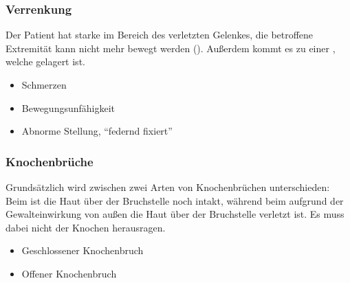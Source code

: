\subsubsection{Verrenkung}
\label{topic:verrenkung-eh}




{%
Der Patient hat starke  im Bereich des verletzten Gelenkes,
die betroffene Extremität kann nicht mehr bewegt werden
(). Außerdem kommt es zu einer , welche  gelagert ist. 

\bigskip

\bigskip

\bigskip
}{
\begin{itemize}
    \item Schmerzen
    \item Bewegungsunfähigkeit
    \item Abnorme Stellung, \enquote{federnd fixiert}
\end{itemize}
}{}{}{}


\protect{}
\protect{}



\subsubsection{Knochenbrüche}
\label{topic:knochenbruch-eh}

{
Grundsätzlich wird zwischen zwei Arten von Knochenbrüchen
unterschieden: Beim  ist die
Haut über der Bruchstelle noch intakt, während beim
 aufgrund der Gewalteinwirkung von
außen die Haut über der Bruchstelle verletzt ist. Es muss
dabei nicht der Knochen herausragen.


\bigskip
}{
\begin{itemize}
    \item Geschlossener Knochenbruch
    \item Offener Knochenbruch
\end{itemize}
}{}{}{}

